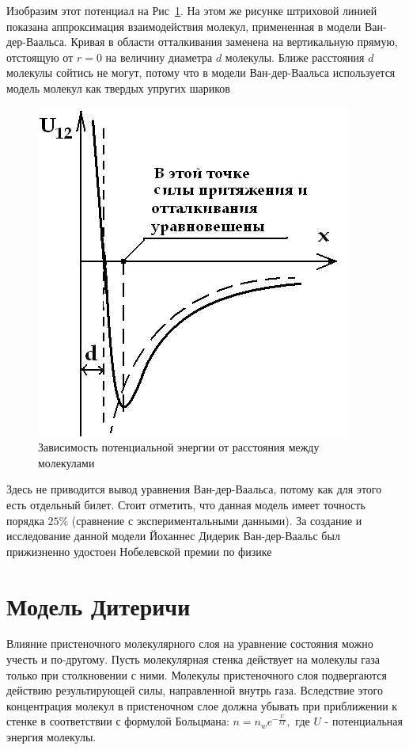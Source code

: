 \documentclass[a4paper, 14pt]{article}
\begin{document}
    Изобразим этот потенциал на Рис~\ref{6-12}.
    На этом же рисунке штриховой линией показана аппроксимация взаимодействия молекул, примененная в модели
    Ван-дер-Ваальса.
    Кривая в области отталкивания заменена на вертикальную прямую, отстоящую от $r = 0$ на величину диаметра $d$
    молекулы.
    Ближе расстояния $d$ молекулы сойтись не могут, потому что в модели Ван-дер-Ваальса используется модель молекул
    как твердых упругих шариков

    \begin{figure}[h]
        \begin{center}
            \includegraphics[width = 0.5 \textwidth]{6-12}
            \caption{Зависимость потенциальной энергии от расстояния между молекулами}\label{6-12}
        \end{center}
    \end{figure}

    Здесь не приводится вывод уравнения Ван-дер-Ваальса, потому как для этого есть отдельный билет.
    Стоит отметить, что данная модель имеет точность порядка $25 \%$ (сравнение с экспериментальными данными).
    За создание и исследование данной модели Йоханнес Дидерик Ван-дер-Ваальс был прижизненно удостоен Нобелевской
    премии по физике


    \section*{Модель Дитеричи} 

    Влияние пристеночного молекулярного слоя на уравнение состояния можно учесть и по-другому.
    Пусть молекулярная стенка действует на молекулы газа только при столкновении с ними.
    Молекулы пристеночного слоя подвергаются действию результирующей силы, направленной внутрь газа.
    Вследствие этого концентрация молекул в пристеночном слое должна убывать при приближении к стенке в соответствии с
    формулой Больцмана: $n = n_w e^{-\frac{U}{kT}}, $ где $U$ - потенциальная энергия молекулы.
\end{document}
